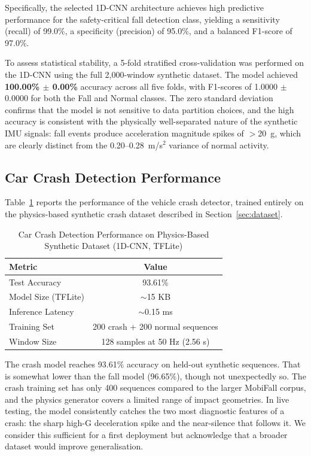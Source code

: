 \documentclass[journal]{IEEEtran}
\begin{document}
Specifically, the selected 1D-CNN architecture achieves high predictive performance for the safety-critical fall detection class, yielding a sensitivity (recall) of 99.0\%, a specificity (precision) of 95.0\%, and a balanced F1-score of 97.0\%.

To assess statistical stability, a 5-fold stratified cross-validation was performed on the 1D-CNN using the full 2,000-window synthetic dataset. The model achieved \textbf{100.00\% $\pm$ 0.00\%} accuracy across all five folds, with F1-scores of 1.0000 $\pm$ 0.0000 for both the Fall and Normal classes. The zero standard deviation confirms that the model is not sensitive to data partition choices, and the high accuracy is consistent with the physically well-separated nature of the synthetic IMU signals: fall events produce acceleration magnitude spikes of $>$20~g, which are clearly distinct from the 0.20--0.28~m/s$^2$ variance of normal activity.

\subsection{Car Crash Detection Performance}

Table~\ref{tab:crash_model} reports the performance of the vehicle crash detector,
trained entirely on the physics-based synthetic crash dataset described in
Section~\ref{sec:dataset}.

\begin{table}[!t]
\renewcommand{\arraystretch}{1.3}
\caption{Car Crash Detection Performance on Physics-Based Synthetic Dataset (1D-CNN, TFLite)}
\label{tab:crash_model}
\centering
\begin{tabular}{lc}
\toprule
\textbf{Metric} & \textbf{Value} \\
\midrule
Test Accuracy         & 93.61\% \\
Model Size (TFLite)   & $\sim$15 KB \\
Inference Latency     & $\sim$0.15 ms \\
Training Set          & 200 crash + 200 normal sequences \\
Window Size           & 128 samples at 50 Hz (2.56 s) \\
\bottomrule
\end{tabular}
\end{table}

The crash model reaches 93.61\% accuracy on held-out synthetic sequences.
That is somewhat lower than the fall model (96.65\%), though not unexpectedly so.
The crash training set has only 400 sequences compared to the larger MobiFall
corpus, and the physics generator covers a limited range of impact geometries.
In live testing, the model consistently catches the two most diagnostic features
of a crash: the sharp high-G deceleration spike and the near-silence that
follows it. We consider this sufficient for a first deployment but acknowledge
that a broader dataset would improve generalisation.
\end{document}
